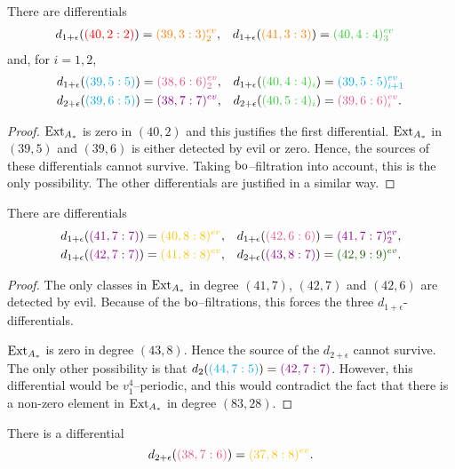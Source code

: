 \begin{prop}\label{prop:cyan39}
There are differentials
\begin{align*}
d_{1+\epsilon}(\gdr{40}{2}{2}{red}) &= \evm{orange}{39}{3}{2}, & d_{1+\epsilon}(\gdr{41}{3}{3}{orange} )&= \evm{limegreen}{40}{4}{3} \end{align*}
and, for $i=1,2$,
\begin{align*}
d_{1+\epsilon}(\gdr{39}{5}{5}{cyan}) &= \evm{lavenderrose}{38}{6}{2}, & d_{1+\epsilon}( \gdm{limegreen}{40}{4}{4}{i}) &= \evm{cyan}{39}{5}{i+1}\\
 d_{2+\epsilon}(\gdr{39}{6}{5}{cyan}) &= \ev{darkmagenta}{38}{7}, & d_{2+\epsilon}( \gdm{limegreen}{40}{5}{4}{i}) &= \evm{lavenderrose}{39}{6}{i}.
\end{align*}
\end{prop}
\begin{proof}
$\operatorname{Ext}_{A_*}$ is zero in $(40,2)$ and this justifies the first differential.
$\operatorname{Ext}_{A_*}$ in $(39,5)$ and $(39,6)$ is either detected by evil or zero. Hence, the sources of these differentials cannot survive. Taking $\mathrm{bo}$--filtration into account, this is the only possibility. The other differentials are justified in a similar way.
\end{proof}


\begin{prop}
There are differentials
\begin{align*}
d_{1+\epsilon}(\gdr{41}{7}{7}{darkmagenta}) &=\ev{goldenpoppy}{40}{8}, & d_{1+\epsilon}(\gdr{42}{6}{6}{lavenderrose}) &= \evm{darkmagenta}{41}{7}{2},\\
d_{1+\epsilon}(\gdr{42}{7}{7}{darkmagenta}) &=\ev{goldenpoppy}{41}{8}, &
d_{2+\epsilon}(\gdr{43}{8}{7}{darkmagenta}) &=\ev{seagreen}{42}{9} .
 \end{align*}
\end{prop}
\begin{proof}
The only classes in $\operatorname{Ext}_{A_*}$ in degree $(41,7)$, $(42,7)$ and $(42,6)$ are detected by evil. Because of the $\mathrm{bo}$--filtrations, this forces the three $d_{1+\epsilon}$-differentials.

$\operatorname{Ext}_{A_*}$ is zero in degree $(43,8)$. Hence the source of the $d_{2+\epsilon}$ cannot survive. The only other possibility is that $d_{2}(\gdr{44}{7}{5}{cyan}) =\gdr{42}{7}{7}{darkmagenta}$. However, this differential would be $v_1^4$--periodic, and this would contradict the fact that there is a non-zero element in $\operatorname{Ext}_{A_*}$ in degree $(83,28)$.
\end{proof}


\begin{prop}\label{prop:hard}
There is a differential
\[d_{2+\epsilon}(\gdr{38}{7}{6}{lavenderrose}) =\ev{goldenpoppy}{37}{8}. \]
\end{prop}

